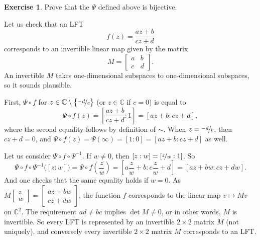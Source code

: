 \documentclass[12pt,openany]{book}
\newcommand{\C}{{\mathbb{C}}}
\theoremstyle{plain}
\theoremstyle{remark}
\theoremstyle{definition}
\newenvironment{exbox}{%
    \def\FrameCommand{\vrule width 1pt \relax\hspace{10pt}}%
    \MakeFramed{\advance\hsize-\width\FrameRestore}%
}{%
    \endMakeFramed
}
\theoremstyle{exercise}
\newtheorem{exercise}{Exercise}[section]
\theoremstyle{example}
\begin{document}
\begin{exbox}
\begin{exercise}
Prove that the $\Psi$ defined above is bijective.
\end{exercise}
\end{exbox}

Let us check that an LFT
\begin{equation*}
f(z) = \frac{a z + b}{c z + d}
\end{equation*}
corresponds to an invertible linear map given by the matrix
\begin{equation*}
M =
\begin{bmatrix}
a & b \\
c & d
\end{bmatrix} .
\end{equation*}
An invertible $M$ takes one-dimensional subspaces to one-dimensional
subspaces, so it sounds plausible.

First, $\Psi \circ f$ for $z \in \C \setminus \bigl\{ \nicefrac{-d}{c} \bigr\}$
(or $z \in \C$ if $c=0$)
is equal to
\begin{equation*}
\Psi \circ f(z) =
\left[\frac{a z + b}{c z + d}: 1 \right]
=
\left[a z + b: c z + d \right] ,
\end{equation*}
where the second equality follows by definition of $\sim$.
When $z = \nicefrac{-d}{c}$, then $cz+d = 0$, and
$\Psi\circ f(z) = \Psi(\infty) = [1:0] = [az+b : cz+d]$ as well.

Let us consider $\Psi \circ f \circ \Psi^{-1}$.
If $w \not= 0$, then $[z:w] = [ \nicefrac{z}{w}:1 ]$.  So
\begin{equation*}
\Psi \circ f \circ \Psi^{-1} \bigl([z:w]\bigr) =
\Psi \circ f \left(\frac{z}{w}\right) =
\left[a \frac{z}{w} + b : c \frac{z}{w} + d \right] =
\left[a z + b w: c z + d w \right] .
\end{equation*}
And one checks that the same equality holds if $w=0$.
As
$M \left[ \begin{smallmatrix} z \\ w \end{smallmatrix} \right]
= \left[ \begin{smallmatrix} 
a z + b w \\ c z + d w
\end{smallmatrix} \right]$,
the function $f$ corresponds to the linear map $v \mapsto Mv$ on $\C^2$.
The requirement $ad \not= bc$ implies $\det M \not= 0$,
or in other words, $M$ is invertible.
So every LFT is represented by an invertible $2 \times 2$ matrix $M$
(not uniquely), and
conversely every invertible $2 \times 2$ matrix $M$ corresponds to an LFT\@.
\end{document}
